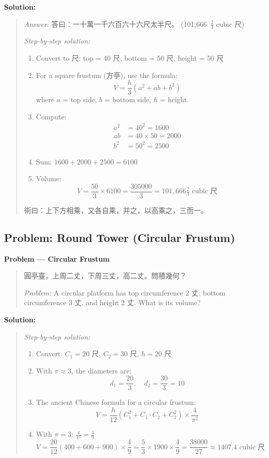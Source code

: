 \documentclass[11pt,a4paper]{article}
\newcommand{\zh}[1]{{#1}}
\newenvironment{chproblem}[1][]{%
  \par\medskip\noindent\textbf{\textcolor{sectioncolor}{#1}}\par\nopagebreak
  \begin{quote}\small
}{%
  \end{quote}\medskip
}
\newenvironment{chsolution}{%
  \par\medskip\noindent\textbf{\textcolor{notecolor}{Solution:}}\par\nopagebreak
  \begin{quote}\small
}{%
  \end{quote}\medskip
}
\newenvironment{stepbystep}{%
  \par\smallskip\noindent\textit{Step-by-step solution:}\par\nopagebreak
  \begin{enumerate}[leftmargin=2em,label=\textbf{Step \arabic*:},ref=\arabic*]
}{%
  \end{enumerate}\medskip
}
\begin{document}
\begin{chsolution}
\textit{Answer:} \zh{答曰：一十萬一千六百六十六尺太半尺。}
(101,666~$\frac{2}{3}$ cubic \zh{尺})

\begin{stepbystep}
\item Convert to \zh{尺}: top = 40 \zh{尺}, bottom = 50 \zh{尺}, height = 50 \zh{尺}

\item For a square frustum (\zh{方亭}), use the formula:
\[
V = \frac{h}{3}(a^2 + ab + b^2)
\]
where $a$ = top side, $b$ = bottom side, $h$ = height.

\item Compute:
\begin{align*}
a^2 &= 40^2 = 1600 \\
ab &= 40 \times 50 = 2000 \\
b^2 &= 50^2 = 2500
\end{align*}

\item Sum: $1600 + 2000 + 2500 = 6100$

\item Volume:
\[
V = \frac{50}{3} \times 6100 = \frac{305000}{3} = 101,666\tfrac{2}{3} \text{ cubic \zh{尺}}
\]
\end{stepbystep}

\zh{術曰：上下方相乘，又各自乘，并之，以高乘之，三而一。}
\end{chsolution}

\subsection{Problem: Round Tower (Circular Frustum)}

\begin{chproblem}[Problem --- Circular Frustum]
\zh{圓亭臺，上周二丈，下周三丈，高二丈。問積幾何？}

\medskip
\textit{Problem:} A circular platform has top circumference 2 \zh{丈}, bottom
circumference 3 \zh{丈}, and height 2 \zh{丈}. What is its volume?
\end{chproblem}

\begin{chsolution}
\begin{stepbystep}
\item Convert: $C_1 = 20$ \zh{尺}, $C_2 = 30$ \zh{尺}, $h = 20$ \zh{尺}

\item With $\pi \approx 3$, the diameters are:
\[
d_1 = \frac{20}{3}, \quad d_2 = \frac{30}{3} = 10
\]

\item The ancient Chinese formula for a circular frustum:
\[
V = \frac{h}{12}(C_1^2 + C_1 \cdot C_2 + C_2^2) \times \frac{4}{\pi^2}
\]

\item With $\pi = 3$: $\frac{4}{\pi^2} = \frac{4}{9}$
\[
V = \frac{20}{12}(400 + 600 + 900) \times \frac{4}{9} = \frac{5}{3} \times 1900 \times \frac{4}{9} = \frac{38000}{27} \approx 1407.4 \text{ cubic \zh{尺}}
\]
\end{stepbystep}
\end{chsolution}
\end{document}
